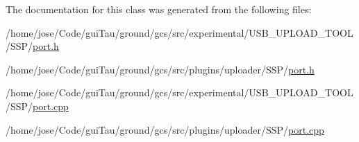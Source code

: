 The documentation for this class was generated from the following files\-:\begin{DoxyCompactItemize}
\item 
/home/jose/\-Code/gui\-Tau/ground/gcs/src/experimental/\-U\-S\-B\-\_\-\-U\-P\-L\-O\-A\-D\-\_\-\-T\-O\-O\-L/\-S\-S\-P/\hyperlink{experimental_2_u_s_b___u_p_l_o_a_d___t_o_o_l_2_s_s_p_2port_8h}{port.\-h}\item 
/home/jose/\-Code/gui\-Tau/ground/gcs/src/plugins/uploader/\-S\-S\-P/\hyperlink{plugins_2uploader_2_s_s_p_2port_8h}{port.\-h}\item 
/home/jose/\-Code/gui\-Tau/ground/gcs/src/experimental/\-U\-S\-B\-\_\-\-U\-P\-L\-O\-A\-D\-\_\-\-T\-O\-O\-L/\-S\-S\-P/\hyperlink{experimental_2_u_s_b___u_p_l_o_a_d___t_o_o_l_2_s_s_p_2port_8cpp}{port.\-cpp}\item 
/home/jose/\-Code/gui\-Tau/ground/gcs/src/plugins/uploader/\-S\-S\-P/\hyperlink{plugins_2uploader_2_s_s_p_2port_8cpp}{port.\-cpp}\end{DoxyCompactItemize}
